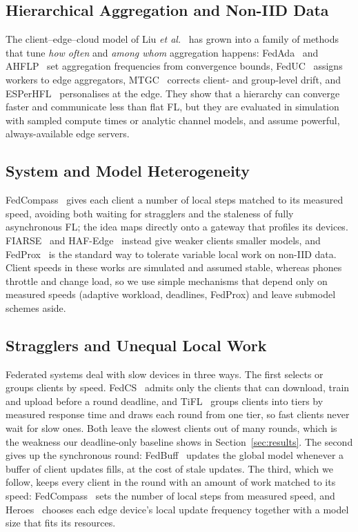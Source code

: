 \documentclass[conference]{IEEEtran}
\begin{document}
\subsection{Hierarchical Aggregation and Non-IID Data}
The client--edge--cloud model of Liu \textit{et al.}~\cite{liu2020} has grown into a family of methods that tune \emph{how often} and \emph{among whom} aggregation happens: FedAda~\cite{luo2024} and AHFLP~\cite{su2025} set aggregation frequencies from convergence bounds, FedUC~\cite{ma2024feduc} assigns workers to edge aggregators, MTGC~\cite{fang2024mtgc} corrects client- and group-level drift, and ESPerHFL~\cite{ma2024esper} personalises at the edge. They show that a hierarchy can converge faster and communicate less than flat FL, but they are evaluated in simulation with sampled compute times or analytic channel models, and assume powerful, always-available edge servers.

\subsection{System and Model Heterogeneity}
FedCompass~\cite{li2024fedcompass} gives each client a number of local steps matched to its measured speed, avoiding both waiting for stragglers and the staleness of fully asynchronous FL; the idea maps directly onto a gateway that profiles its devices. FIARSE~\cite{wu2024fiarse} and HAF-Edge~\cite{gao2024} instead give weaker clients smaller models, and FedProx~\cite{li2020fedprox} is the standard way to tolerate variable local work on non-IID data. Client speeds in these works are simulated and assumed stable, whereas phones throttle and change load, so we use simple mechanisms that depend only on measured speeds (adaptive workload, deadlines, FedProx) and leave submodel schemes aside.

\subsection{Stragglers and Unequal Local Work}
Federated systems deal with slow devices in three ways. The first selects or groups clients by speed. FedCS~\cite{nishio2019fedcs} admits only the clients that can download, train and upload before a round deadline, and TiFL~\cite{chai2020tifl} groups clients into tiers by measured response time and draws each round from one tier, so fast clients never wait for slow ones. Both leave the slowest clients out of many rounds, which is the weakness our deadline-only baseline shows in Section~\ref{sec:results}. The second gives up the synchronous round: FedBuff~\cite{nguyen2022fedbuff} updates the global model whenever a buffer of client updates fills, at the cost of stale updates. The third, which we follow, keeps every client in the round with an amount of work matched to its speed: FedCompass~\cite{li2024fedcompass} sets the number of local steps from measured speed, and Heroes~\cite{yan2024heroes} chooses each edge device's local update frequency together with a model size that fits its resources.
\end{document}

